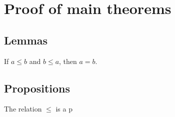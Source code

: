 
\chapter{Proof of main theorems} \label{chp:proof}

\section{Lemmas}

\begin{lemma} \label{lem:2}
	If $ a \leq b $ and $ b \leq a $, then $ a = b $.
\end{lemma}

\section{Propositions}

\begin{proposition}\label{prop:1}
	The relation $ \leq $ is a p
\end{proposition}